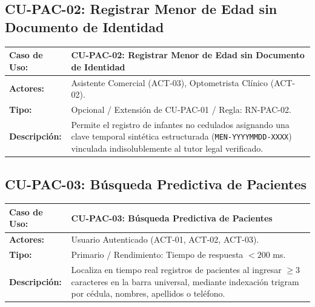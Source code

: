 \documentclass[12pt,a4paper]{report}
\begin{document}
\subsection{CU-PAC-02: Registrar Menor de Edad sin Documento de Identidad}
\begin{table}[H]
\centering
\small
\begin{tabularx}{\textwidth}{|L{3.5cm}|X|}
\hline
{}\color{white}\textbf{Caso de Uso:} & \textbf{CU-PAC-02: Registrar Menor de Edad sin Documento de Identidad} \\
\hline
\textbf{Actores:} & Asistente Comercial (ACT-03), Optometrista Clínico (ACT-02). \\
\hline
\textbf{Tipo:} & Opcional / Extensión de CU-PAC-01 / Regla: RN-PAC-02. \\
\hline
\textbf{Descripción:} & Permite el registro de infantes no cedulados asignando una clave temporal sintética estructurada (\texttt{MEN-YYYYMMDD-XXXX}) vinculada indisolublemente al tutor legal verificado. \\
\hline
\end{tabularx}
\end{table}

\subsection{CU-PAC-03: Búsqueda Predictiva de Pacientes}
\begin{table}[H]
\centering
\small
\begin{tabularx}{\textwidth}{|L{3.5cm}|X|}
\hline
{}\color{white}\textbf{Caso de Uso:} & \textbf{CU-PAC-03: Búsqueda Predictiva de Pacientes} \\
\hline
\textbf{Actores:} & Usuario Autenticado (ACT-01, ACT-02, ACT-03). \\
\hline
\textbf{Tipo:} & Primario / Rendimiento: Tiempo de respuesta $< 200$ ms. \\
\hline
\textbf{Descripción:} & Localiza en tiempo real registros de pacientes al ingresar $\ge 3$ caracteres en la barra universal, mediante indexación trigram por cédula, nombres, apellidos o teléfono. \\
\hline
\end{tabularx}
\end{table}

\newpage
\end{document}
